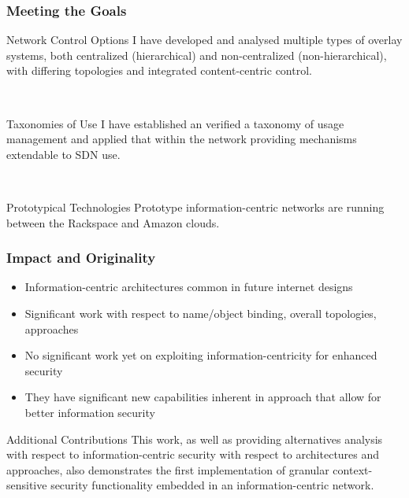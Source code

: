 \documentclass[t,handout]{beamer}
\begin{document}
\begin{frame}
\frametitle{Meeting the Goals}
\begin{beamerboxesrounded}[shadow]{Network Control Options}
{\small I have developed and analysed multiple types of overlay systems, both centralized (hierarchical) and non-centralized (non-hierarchical), with differing topologies and integrated content-centric control.}
\end{beamerboxesrounded}
~\\
\begin{beamerboxesrounded}[shadow]{Taxonomies of Use}
{\small I have established an verified a taxonomy of usage management and applied that within the network providing mechanisms extendable to SDN use.}
\end{beamerboxesrounded}
~\\
\begin{beamerboxesrounded}[shadow]{Prototypical Technologies}
{\small Prototype information-centric networks are running between the Rackspace and Amazon clouds.}
\end{beamerboxesrounded}
\end{frame}

\begin{frame}
\frametitle{Impact and Originality}
\begin{itemize}
\item Information-centric architectures common in future internet designs
\item Significant work with respect to name/object binding, overall topologies, approaches
\item No significant work yet on exploiting information-centricity for enhanced security
\item They have significant new capabilities inherent in approach that allow for better information security
\end{itemize}
\begin{beamerboxesrounded}[shadow]{Additional Contributions}
{\small This work, as well as providing alternatives analysis with respect to information-centric security with respect to architectures and approaches, also demonstrates the first implementation of granular context-sensitive security functionality embedded in an information-centric network.}
\end{beamerboxesrounded}
\end{frame}
\end{document}
